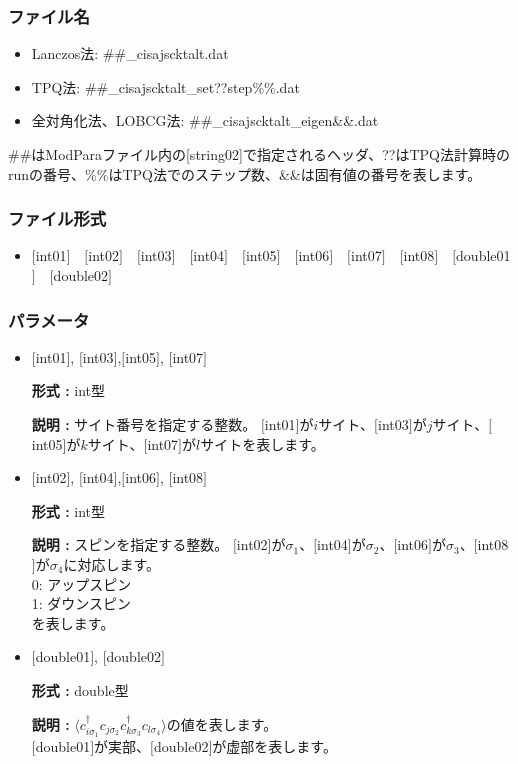 \subsubsection{ファイル名}
 \begin{itemize}
   \item{Lanczos法:}  \#\#\_cisajscktalt.dat
   \item{TPQ法:} \#\#\_cisajscktalt\_set??step\%\%.dat
   \item{全対角化法、LOBCG法:}  \#\#\_cisajscktalt\_eigen{\&\&}.dat
  \end{itemize}
  \#\#はModParaファイル内の[string02]で指定されるヘッダ、??はTPQ法計算時のrunの番号、\%\%はTPQ法でのステップ数、\&\&は固有値の番号を表します。


\subsubsection{ファイル形式}
 \begin{itemize}
   \item  $[$int01$]$~~$[$int02$]$~~$[$int03$]$~~$[$int04$]$~~$[$int05$]$~~$[$int06$]$~~$[$int07$]$~~$[$int08$]$~~$[$double01$]$~~$[$double02$]$
  \end{itemize}
\subsubsection{パラメータ}
 \begin{itemize}

  \item  $[$int01$]$, $[$int03$]$,$[$int05$]$, $[$int07$]$

 {\bf 形式 :} int型

{\bf 説明 :} サイト番号を指定する整数。
$[$int01$]$が$i$サイト、$[$int03$]$が$j$サイト、$[$int05$]$が$k$サイト、$[$int07$]$が$l$サイトを表します。
 
  \item  $[$int02$]$, $[$int04$]$,$[$int06$]$, $[$int08$]$

 {\bf 形式 :} int型 

{\bf 説明 :} スピンを指定する整数。
$[$int02$]$が$\sigma_1$、$[$int04$]$が$\sigma_2$、$[$int06$]$が$\sigma_3$、$[$int08$]$が$\sigma_4$に対応します。\\
0: アップスピン\\
1: ダウンスピン\\
を表します。

  \item  $[$double01$]$, $[$double02$]$

 {\bf 形式 :} double型 

{\bf 説明 :} $\langle c_{i\sigma_1}^{\dagger}c_{j\sigma_2}c_{k\sigma_3}^{\dagger}c_{l\sigma_4}\rangle$の値を表します。\\
$[$double01$]$が実部、$[$double02$]$が虚部を表します。\\
\end{itemize}


